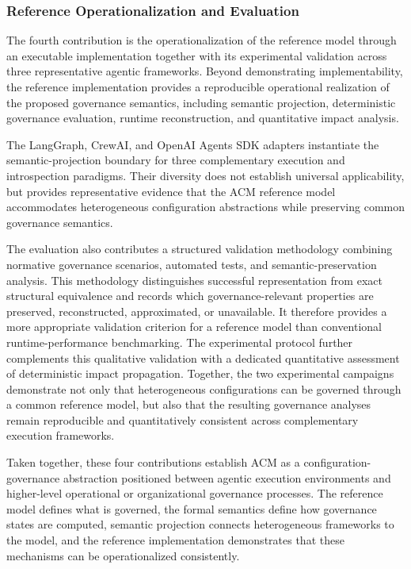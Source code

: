 \documentclass[10pt]{article}
\begin{document}
\subsubsection{Reference Operationalization and Evaluation}

The fourth contribution is the operationalization of the reference model through an executable implementation together with its experimental validation across three representative agentic frameworks. Beyond demonstrating implementability, the reference implementation provides a reproducible operational realization of the proposed governance semantics, including semantic projection, deterministic governance evaluation, runtime reconstruction, and quantitative impact analysis.

The LangGraph, CrewAI, and OpenAI Agents SDK adapters instantiate the semantic-projection boundary for three complementary execution and introspection paradigms. Their diversity does not establish universal applicability, but provides representative evidence that the ACM reference model accommodates heterogeneous configuration abstractions while preserving common governance semantics. 

The evaluation also contributes a structured validation methodology combining normative governance scenarios, automated tests, and semantic-preservation analysis. This methodology distinguishes successful representation from exact structural equivalence and records which governance-relevant properties are preserved, reconstructed, approximated, or unavailable. It therefore provides a more appropriate validation criterion for a reference model than conventional runtime-performance benchmarking. The experimental protocol further complements this qualitative validation with a dedicated quantitative assessment of deterministic impact propagation. Together, the two experimental campaigns demonstrate not only that heterogeneous configurations can be governed through a common reference model, but also that the resulting governance analyses remain reproducible and quantitatively consistent across complementary execution frameworks.

Taken together, these four contributions establish ACM as a configuration-governance abstraction positioned between agentic execution environments and higher-level operational or organizational governance processes. The reference model defines what is governed, the formal semantics define how governance states are computed, semantic projection connects heterogeneous frameworks to the model, and the reference implementation demonstrates that these mechanisms can be operationalized consistently.
\end{document}
